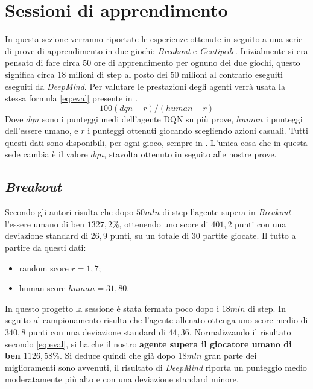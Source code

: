 \documentclass[twoside,twocolumn,10pt]{extarticle}
\theoremstyle{definition}
\begin{document}
\section{Sessioni di apprendimento}
	In questa sezione verranno riportate le esperienze ottenute in seguito a una serie di prove di apprendimento in due giochi: \textit{Breakout} e \textit{Centipede}. Inizialmente si era pensato di fare circa $50$ ore di apprendimento per ognuno dei due giochi, questo significa circa $18$ milioni di step al posto dei $50$ milioni al contrario eseguiti eseguiti da \textit{DeepMind}. Per valutare le prestazioni degli agenti verrà usata la stessa formula \ref{eq:eval} presente in \cite{bib:dqn}.
	\begin{equation}\label{eq:eval}
		100(dqn - r)/(human - r)
	\end{equation}
	Dove $dqn$ sono i punteggi medi dell'agente DQN su più prove, $human$ i punteggi dell'essere umano, e $r$ i punteggi ottenuti giocando scegliendo azioni casuali. Tutti questi dati sono disponibili, per ogni gioco, sempre in \cite{bib:dqn}. L'unica cosa che in questa sede cambia è il valore $dqn$, stavolta ottenuto in seguito alle nostre prove.
	
	\subsection{\textit{Breakout}}
		Secondo gli autori risulta che dopo $50mln$ di step l'agente supera in \textit{Breakout} l'essere umano di ben $1327,2\%$, ottenendo uno score di $401,2$ punti con una deviazione standard di $26,9$ punti, su un totale di $30$ partite giocate. Il tutto a partire da questi dati:
		\begin{itemize}
			\item random score $r = 1,7$;
			\item human score $human = 31,80$.
		\end{itemize}
		
		In questo progetto la sessione è stata fermata poco dopo i $18mln$ di step. In seguito al campionamento risulta che l'agente allenato ottenga uno score medio di $340,8$ punti con una deviazione standard di $44,36$. Normalizzando il risultato secondo \ref{eq:eval}, si ha che il nostro \textbf{agente supera il giocatore umano di ben $1126,58\%$}. Si deduce quindi che già dopo $18mln$ gran parte dei miglioramenti sono avvenuti, il risultato di \textit{DeepMind} riporta un punteggio medio moderatamente più alto e con una deviazione standard minore.
\end{document}
